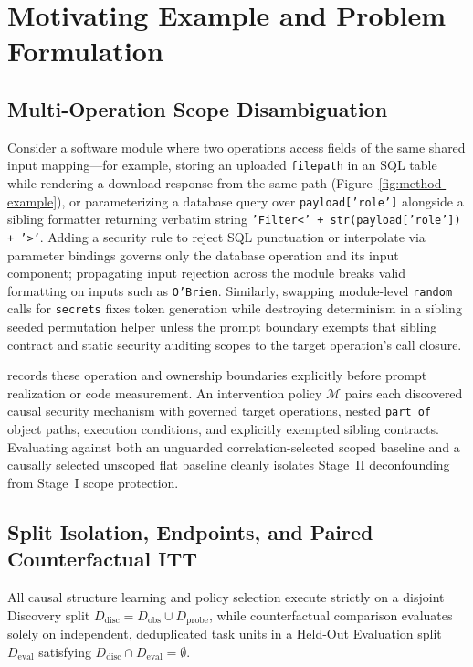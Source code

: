 \section{Motivating Example and Problem Formulation}

\subsection{Multi-Operation Scope Disambiguation}

Consider a software module where two operations access fields of the same
shared input mapping---for example, storing an uploaded \texttt{filepath} in an
SQL table while rendering a download response from the same path
(Figure~\ref{fig:method-example}), or parameterizing a database query over
\texttt{payload['role']} alongside a sibling formatter returning verbatim string
\texttt{'Filter<' + str(payload['role']) + '>'}. Adding a security rule to reject
SQL punctuation or interpolate via parameter bindings governs only the database
operation and its input component; propagating input rejection across the module
breaks valid formatting on inputs such as \texttt{O'Brien}. Similarly, swapping
module-level \texttt{random} calls for \texttt{secrets} fixes token generation
while destroying determinism in a sibling seeded permutation helper unless the
prompt boundary exempts that sibling contract and static security auditing
scopes to the target operation's call closure.

\prompttsg records these operation and ownership boundaries explicitly before
prompt realization or code measurement. An intervention policy $\mathcal{M}$
pairs each discovered causal security mechanism with governed target
operations, nested \texttt{part\_of} object paths, execution conditions, and
explicitly exempted sibling contracts. Evaluating \model against both an
unguarded correlation-selected scoped baseline and a causally selected unscoped
flat baseline cleanly isolates Stage~II deconfounding from Stage~I scope
protection.

\subsection{Split Isolation, Endpoints, and Paired Counterfactual ITT}
\label{sec:matter-definition}

All causal structure learning and policy selection execute strictly on a
disjoint Discovery split $D_{\mathrm{disc}} = D_{\mathrm{obs}} \cup
D_{\mathrm{probe}}$, while counterfactual comparison evaluates solely on
independent, deduplicated task units in a Held-Out Evaluation split
$D_{\mathrm{eval}}$ satisfying $D_{\mathrm{disc}} \cap D_{\mathrm{eval}} =
\emptyset$.

